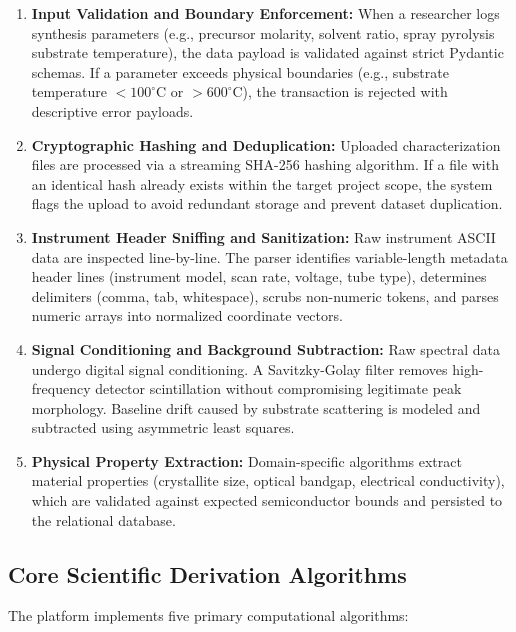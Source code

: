 \documentclass[12pt,a4paper,oneside]{report}
\begin{document}
{{{\begin{enumerate}
    \item \textbf{Input Validation and Boundary Enforcement:} When a researcher logs synthesis parameters (e.g., precursor molarity, solvent ratio, spray pyrolysis substrate temperature), the data payload is validated against strict Pydantic schemas. If a parameter exceeds physical boundaries (e.g., substrate temperature $< 100^\circ\text{C}$ or $> 600^\circ\text{C}$), the transaction is rejected with descriptive error payloads.
    \item \textbf{Cryptographic Hashing and Deduplication:} Uploaded characterization files are processed via a streaming SHA-256 hashing algorithm. If a file with an identical hash already exists within the target project scope, the system flags the upload to avoid redundant storage and prevent dataset duplication.
    \item \textbf{Instrument Header Sniffing and Sanitization:} Raw instrument ASCII data are inspected line-by-line. The parser identifies variable-length metadata header lines (instrument model, scan rate, voltage, tube type), determines delimiters (comma, tab, whitespace), scrubs non-numeric tokens, and parses numeric arrays into normalized coordinate vectors.
    \item \textbf{Signal Conditioning and Background Subtraction:} Raw spectral data undergo digital signal conditioning. A Savitzky-Golay filter removes high-frequency detector scintillation without compromising legitimate peak morphology. Baseline drift caused by substrate scattering is modeled and subtracted using asymmetric least squares.
    \item \textbf{Physical Property Extraction:} Domain-specific algorithms extract material properties (crystallite size, optical bandgap, electrical conductivity), which are validated against expected semiconductor bounds and persisted to the relational database.
\end{enumerate}

\subsection{Core Scientific Derivation Algorithms}

The platform implements five primary computational algorithms:

}}}
\end{document}
